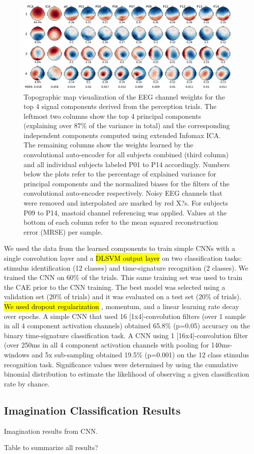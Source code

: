 \begin{figure}[t]
  \begin{center}
    \includegraphics[width=\columnwidth,keepaspectratio=true]{Figures/topoplots_all.pdf}
    \caption{
Topographic map visualization of the EEG channel weights for the top 4 signal components derived from the perception trials. The leftmost two columns show the top 4 principal components (explaining over 87\% of the variance in total) and the corresponding independent components computed using extended Infomax ICA. The remaining columns show the weights learned by the convolutional auto-encoder for all subjects combined (third column) and all individual subjects labeled P01 to P14 accordingly. Numbers below the plots refer to the percentage of explained variance for principal components and the normalized biases for the filters of the convolutional auto-encoder respectively. Noisy EEG channels that were removed and interpolated are marked by red X?s. For subjects P09 to P14, mastoid channel referencing was applied. Values at the bottom of each column refer to the mean squared reconstruction error (MRSE) per sample.
}
    \label{fig:components}
  \end{center}
\end{figure}

We used the data from the learned components to train simple \ac{CNN}s with a single convolution layer and a \hl{DLSVM output layer} \cite{tang_deep_2013} on two classification tasks: stimulus identification (12 classes) and time-signature recognition (2 classes). 
We trained the CNN on 60\% of the trials. This same training set was used to train the \ac{CAE} prior to the \ac{CNN} training. 
The best model was selected using a validation set (20\% of trials) and it was evaluated on a test set (20\% of trials). 
\hl{We used dropout regularization} \cite{hinton_improving_2012}, momentum, and a linear learning rate decay over epochs.
A simple \ac{CNN} that used 16 [1x4]-convolution filters (over 1 sample in all 4 component activation channels) obtained 65.8\% (p=0.05) accuracy on the binary time-signature classification task. 
A CNN using 1 [16x4]-convolution filter (over 250ms in all 4 component activation channels with pooling for 140ms-windows and 5x sub-sampling obtained 19.5\% (p=0.001) on the 12 class stimulus recognition task. 
Significance values were determined by using the cumulative binomial distribution to estimate the likelihood of observing a given classification rate by chance.

\subsection*{Imagination Classification Results}
Imagination results from CNN. 

Table to summarize all results? 
